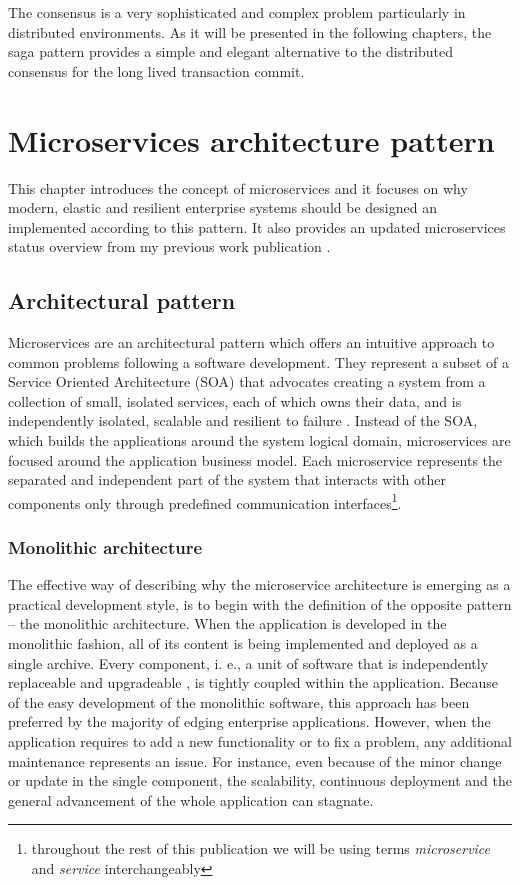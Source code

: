 \documentclass[oneside,
  digital, %
  table,   %
  nolof,     %
  nolot,     %
]{fithesis3}
\begin{document}
The consensus is a very sophisticated and complex problem particularly in distributed environments. As it will be presented in the following chapters, the saga pattern \cite{sagas_publ} provides a simple and elegant alternative to the distributed consensus for the long lived transaction commit.



\clearpage
\chapter{Microservices architecture pattern}

This chapter introduces the concept of microservices and it focuses on why modern, elastic and resilient enterprise systems should be designed an implemented according to this pattern. It also provides an updated microservices status overview from my previous work publication \cite{bachelor_thesis}.

\section{Architectural pattern}

Microservices are an architectural pattern which offers an intuitive approach to common problems following a software development. They represent a subset of a Service Oriented Architecture (SOA) \cite{soa} that advocates creating a system from a collection of small, isolated services, each of which owns their data, and is independently isolated, scalable and resilient to failure \cite{reactive_ms_arch}. Instead of the SOA, which builds the applications around the system logical domain, microservices are focused around the application business model. Each microservice represents the separated and independent part of the system that interacts with other components only through predefined communication interfaces\footnote{throughout the rest of this publication we will be using terms \textit{microservice} and \textit{service} interchangeably}.

\subsection{Monolithic architecture}

The effective way of describing why the microservice architecture is emerging as a practical development style, is to begin with the definition of the opposite pattern -- the monolithic architecture. When the application is developed in the monolithic fashion, all of its content is being implemented and deployed as a single archive. Every component, i. e., a unit of software that is independently replaceable and upgradeable \cite{microservices}, is tightly coupled within the application. Because of the easy development of the monolithic software, this approach has been preferred by the majority of edging enterprise applications. However, when the application requires to add a new functionality or to fix a problem, any additional maintenance represents an issue. For instance, even because of the minor change or update in the single component, the scalability, continuous deployment and the general advancement of the whole application can stagnate. 
\end{document}
